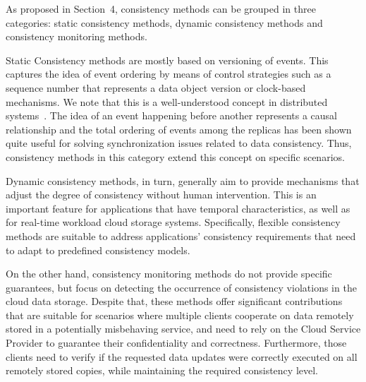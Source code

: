 \begin{comment}
Regarding the dynamic consistency methods there are \textit{automated and self-adaptive consistency} \cite{chihoub2012harmony, esteves2012quality, Terry:2013} and \textit{flexible consistency guarantees} methods \cite{Chen:2014, sivasubramanian2012amazon}. Instead of to apply the same consistency guarantee methods' approach, the automated and self-adaptive are focused in achieve automaticity in their consistency guarantees by the use of mechanisms that adjust the degrees of consistency without human intervention. This is an important feature for applications that have temporal characteristics, which require dynamic adjustment in the consistency requisites of data over time and real-time workload cloud storage systems. Moreover, the flexible guarantees approach seeks to address the applications’ consistency requirements and flexibly adapt to predefined consistency models.
}
\end{comment}

\vspace{2mm}
As proposed in Section~4, consistency methods can be grouped in three categories: static consistency methods, dynamic consistency methods and consistency monitoring methods.

Static Consistency methods are mostly based on versioning of events. This captures the idea of event ordering by means of control strategies such as a sequence number that represents a data object version or clock-based mechanisms. We note that this is a well-understood concept in distributed systems~\cite{fidge1991logical, lamport1978time, mattern1989virtual}. The idea of an event happening before another represents a causal relationship and the total ordering of events among the replicas has been shown quite useful for solving synchronization issues related to data consistency. Thus, consistency methods in this category extend this concept on specific scenarios.

Dynamic consistency methods, in turn, generally aim to provide mechanisms that adjust the degree of consistency without human intervention. This is an important feature for applications that have temporal characteristics, 
as well as for real-time workload cloud storage systems. Specifically, flexible consistency methods are suitable to address applications’ consistency requirements that need to adapt to predefined consistency models.

On the other hand, consistency monitoring methods do not provide specific guarantees, but focus on detecting the occurrence of consistency violations in the cloud data storage.  Despite that, these methods offer significant contributions that are suitable for scenarios where multiple clients cooperate on data remotely stored in a potentially misbehaving service, and need to rely on the Cloud Service Provider to guarantee their confidentiality and correctness. Furthermore, those clients need to verify if the requested data updates 
{\al were} correctly executed on all remotely stored copies, while maintaining the required consistency level.


